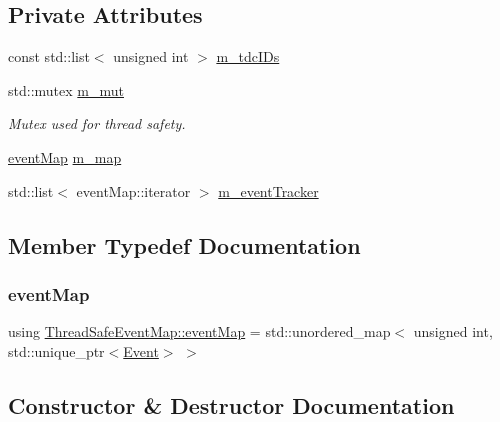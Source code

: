 \subsection*{Private Attributes}
\begin{DoxyCompactItemize}
\item 
const std\+::list$<$ unsigned int $>$ \hyperlink{class_thread_safe_event_map_ad079392d8a51bb1cc7835c52489fa6ca}{m\+\_\+tdc\+I\+Ds}
\item 
std\+::mutex \hyperlink{class_thread_safe_event_map_ada4e8c2f2195df86503e73674ff30935}{m\+\_\+mut}
\begin{DoxyCompactList}\small\item\em Mutex used for thread safety. \end{DoxyCompactList}\item 
\hyperlink{class_thread_safe_event_map_a069c80cec7636a015d8a69574157d8d2}{event\+Map} \hyperlink{class_thread_safe_event_map_a15d9d8928ff7dc51fa48a1829575b47e}{m\+\_\+map}
\item 
std\+::list$<$ event\+Map\+::iterator $>$ \hyperlink{class_thread_safe_event_map_abfd8bf29e9ff254df217bd2b9e32f50c}{m\+\_\+event\+Tracker}
\end{DoxyCompactItemize}


\subsection{Member Typedef Documentation}
\mbox{\label{class_thread_safe_event_map_a069c80cec7636a015d8a69574157d8d2}} 
\subsubsection{\texorpdfstring{event\+Map}{eventMap}}
{\footnotesize\ttfamily using \hyperlink{class_thread_safe_event_map_a069c80cec7636a015d8a69574157d8d2}{Thread\+Safe\+Event\+Map\+::event\+Map} =  std\+::unordered\+\_\+map$<$ unsigned int, std\+::unique\+\_\+ptr$<$\hyperlink{class_event}{Event}$>$ $>$\hspace{0.3cm}{\ttfamily [private]}}



\subsection{Constructor \& Destructor Documentation}
\mbox{\label{class_thread_safe_event_map_ace03ee2a6017dfee50a61c68626d2345}} 
